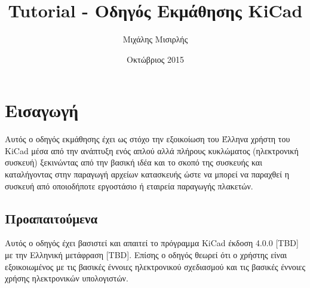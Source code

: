 \documentclass[a4paper]{article}
\title{Tutorial - Οδηγός Εκμάθησης KiCad}
\author{Μιχάλης Μισιρλής}
\date{Οκτώβριος 2015}
\begin{document}
\maketitle

\section{Εισαγωγή}
Αυτός ο οδηγός εκμάθησης έχει ως στόχο την εξοικοίωση του Έλληνα χρήστη του KiCad μέσα από την ανάπτυξη ενός απλού αλλά πλήρους κυκλώματος (ηλεκτρονική συσκευή) ξεκινώντας από την βασική ιδέα και το σκοπό της συσκευής και καταλήγοντας στην παραγωγή αρχείων κατασκευής ώστε να μπορεί να παραχθεί η συσκευή από οποιοδήποτε εργοστάσιο ή εταιρεία παραγωγής πλακετών.

\subsection{Προαπαιτούμενα}
Αυτός ο οδηγός έχει βασιστεί και απαιτεί το πρόγραμμα KiCad έκδοση 4.0.0 [TBD] με την Ελληνική μετάφραση [TBD]. Επίσης ο οδηγός θεωρεί ότι ο χρήστης είναι εξοικοιωμένος με τις βασικές έννοιες ηλεκτρονικού σχεδιασμού και τις βασικές έννοιες χρήσης ηλεκτρονικών υπολογιστών.
\end{document}
